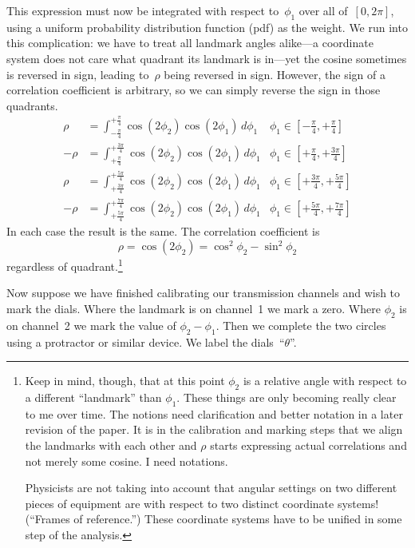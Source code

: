 \documentclass[9pt,technote]{IEEEtran}
\begin{document}
This expression must now be integrated with respect to~$\phi_1$ over
all of~$[0,2\pi]$, using a uniform probability distribution function
(pdf) as the weight. We run into this complication: we have to treat
all landmark angles alike---a coordinate system does not care what
quadrant its landmark is in---yet the cosine sometimes is reversed in
sign, leading to~$\rho$ being reversed in sign. However, the sign of a
correlation coefficient is arbitrary, so we can simply reverse the
sign in those quadrants.
\begin{align}
\rho &= \int_{-\frac{\pi}{4}}^{+\frac{\pi}{4}}\cos(2\phi_2)\cos(2\phi_1)\,d\phi_1&\phi_1\in[-\frac{\pi}{4},+\frac{\pi}{4}] \\
-\rho &= \int_{+\frac{\pi}{4}}^{+\frac{3\pi}{4}}\cos(2\phi_2)\cos(2\phi_1)\,d\phi_1&\phi_1\in[+\frac{\pi}{4},+\frac{3\pi}{4}] \\
\rho &= \int_{+\frac{3\pi}{4}}^{+\frac{5\pi}{4}}\cos(2\phi_2)\cos(2\phi_1)\,d\phi_1&\phi_1\in[+\frac{3\pi}{4},+\frac{5\pi}{4}] \\
-\rho &= \int_{+\frac{5\pi}{4}}^{+\frac{7\pi}{4}}\cos(2\phi_2)\cos(2\phi_1)\,d\phi_1&\phi_1\in[+\frac{5\pi}{4},+\frac{7\pi}{4}]
\end{align}
In each case the result is the same. The correlation coefficient is
\begin{equation}
  \rho = \cos(2\phi_2) = \cos^2\phi_2 - \sin^2\phi_2
\end{equation}
regardless of quadrant.\footnote{Keep in mind, though, that at this
  point $\phi_2$ is a relative angle with respect to a different
  ``landmark'' than $\phi_1$. These things are only becoming really
  clear to me over time. The notions need clarification and better
  notation in a later revision of the paper. It is in the calibration
  and marking steps that we align the landmarks with each other and
  $\rho$ starts expressing actual correlations and not merely some
  cosine. I need notations.\par Physicists are not taking into account
  that angular settings on two different pieces of equipment are with
  respect to two distinct coordinate systems! (``Frames of
  reference.'') These coordinate systems have to be unified in some
  step of the analysis.}

Now suppose we have finished calibrating our transmission channels and
wish to mark the dials. Where the landmark is on channel~1 we mark a
zero. Where $\phi_2$ is on channel~2 we mark the value of
$\phi_2-\phi_1$. Then we complete the two circles using a protractor
or similar device. We label the dials~``$\theta$''.
\end{document}
